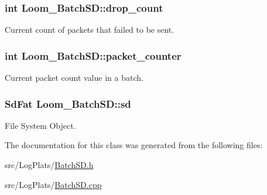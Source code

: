 \subsubsection[{\texorpdfstring{drop\+\_\+count}{drop_count}}]{\setlength{\rightskip}{0pt plus 5cm}int Loom\+\_\+\+Batch\+S\+D\+::drop\+\_\+count\hspace{0.3cm}{\ttfamily [protected]}}\hypertarget{class_loom___batch_s_d_a24ec8915a5e1789b64e1593e6215982a}{}\label{class_loom___batch_s_d_a24ec8915a5e1789b64e1593e6215982a}


Current count of packets that failed to be sent. 

\subsubsection[{\texorpdfstring{packet\+\_\+counter}{packet_counter}}]{\setlength{\rightskip}{0pt plus 5cm}int Loom\+\_\+\+Batch\+S\+D\+::packet\+\_\+counter\hspace{0.3cm}{\ttfamily [protected]}}\hypertarget{class_loom___batch_s_d_af26d1091a8d6368edbf1456d016c0b78}{}\label{class_loom___batch_s_d_af26d1091a8d6368edbf1456d016c0b78}


Current packet count value in a batch. 

\subsubsection[{\texorpdfstring{sd}{sd}}]{\setlength{\rightskip}{0pt plus 5cm}Sd\+Fat Loom\+\_\+\+Batch\+S\+D\+::sd\hspace{0.3cm}{\ttfamily [protected]}}\hypertarget{class_loom___batch_s_d_a26a8fecb120202e86c5c884d055ad8ae}{}\label{class_loom___batch_s_d_a26a8fecb120202e86c5c884d055ad8ae}


File System Object. 



The documentation for this class was generated from the following files\+:\begin{DoxyCompactItemize}
\item 
src/\+Log\+Plats/\hyperlink{_batch_s_d_8h}{Batch\+S\+D.\+h}\item 
src/\+Log\+Plats/\hyperlink{_batch_s_d_8cpp}{Batch\+S\+D.\+cpp}\end{DoxyCompactItemize}
